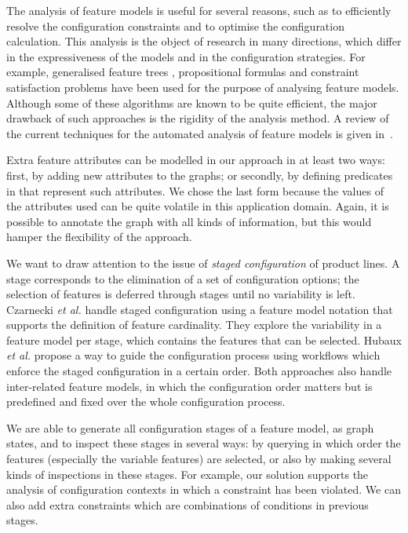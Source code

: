 The analysis of feature models is useful for several reasons, such as to
efficiently resolve the configuration constraints and to optimise the
configuration calculation. This analysis is the object of research in many
directions, which differ in the expressiveness of the models and in the
configuration strategies. For example, generalised feature trees \cite{Broek2009},
propositional formulas \cite{Batory2005} and constraint satisfaction problems
\cite{Benavides2005} have been used for the purpose of analysing feature
models. Although some of these algorithms are known to be quite efficient, the
major drawback of such approaches is the rigidity of the analysis method. A
review of the current techniques for the automated analysis of feature models is
given in~\cite{Benavides2010}.

Extra feature attributes can be modelled in our approach in at least two ways:
first, by adding new attributes to the graphs; or secondly, by defining
predicates in \Prolog that represent such attributes. We chose the last form
because the values of the attributes used can be quite volatile in this
application domain. Again, it is possible to annotate the graph with all kinds
of information, but this would hamper the flexibility of the approach.

\medskip\noindent We want to draw attention to the issue of \emph{staged
configuration} of product lines. A stage corresponds to the elimination of a set
of configuration options; the selection of features is deferred through stages
until no variability is left. Czarnecki \emph{et al.} \cite{Czarnecki2004}
handle staged configuration using a feature model notation that supports
the definition of feature cardinality.
They explore the variability in a feature model per stage, which contains the
features that can be selected. Hubaux \emph{et al.} \cite{Hubaux2009} propose a
way to guide the configuration process using workflows which enforce the staged
configuration in a certain order. Both approaches also handle inter-related
feature models, in which the configuration order matters but is predefined and
fixed over the whole configuration process.

We are able to generate all configuration stages of a feature model, as graph
states, and to inspect these stages in several ways: by querying in which order
the features (especially the variable features) are selected, or also by making
several kinds of inspections in these stages. For example, our \GROOVE
solution supports the analysis of configuration contexts in which a constraint
has been violated. We can also add extra constraints which are combinations of
conditions in previous stages.
